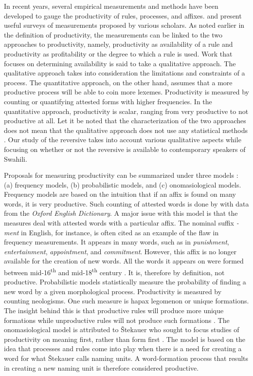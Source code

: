 \documentclass[output=paper]{langsci/langscibook}
\begin{document}
In recent years, several empirical measurements and methods have been developed to gauge the productivity of rules, processes, and affixes. \citet[143-161]{Bauer2001} and \citet{Fernandez-Dominguezetal2007} present useful surveys of measurements proposed by various scholars. As noted earlier in the definition of productivity, the measurements can be linked to the two approaches to productivity, namely, productivity as availability of a rule and productivity as profitability or the degree to which a rule is used. Work that focuses on determining availability is said to take a qualitative approach. The qualitative approach  takes into consideration the limitations and constraints of a process. The quantitative approach, on the other hand, assumes that a more productive process will be able to coin more lexemes. Productivity is measured by counting or quantifying attested forms with higher frequencies. In the quantitative approach, productivity is scalar, ranging from very productive to not productive at all. Let it be noted that the characterization of the two approaches does not mean that the qualitative approach does not use any statistical methods \citep[434-437]{Fernandez-Dominguez2013}. Our study of the reversive takes into account various qualitative aspects while focusing on whether or not the reversive is available to contemporary speakers of Swahili. 

Proposals for measuring productivity can be summarized under three models \citep[35]{Fernandez-Dominguezetal2007}: (a) frequency models, (b) probabilistic models, and (c) onomasiological models. Frequency models are based on the intuition that if an affix is found on many words, it is very productive. Such counting of attested words is done by \citet{Plag1999} with data from the \textit{Oxford English Dictionary}. A major issue with this model is that the measures deal with attested words with a particular affix. The nominal suffix \textit{-ment} in English, for instance, is often cited as an example of the flaw in frequency measurements. It appears in many words, such as in \textit{punishment}, \textit{entertainment}, \textit{appointment}, and \textit{commitment}. However, this affix is no longer available for the creation of new words. All the words it appears on were formed between mid-16\textsuperscript{th} and mid-18\textsuperscript{th} century \citep[181]{Bauer2001}. It is, therefore by definition, not productive. Probabilistic models statistically measure the probability of finding a new word by a given morphological process. Productivity is measured by counting neologisms. One such measure is hapax legomenon or unique formations. The insight behind this is that productive rules will produce more unique formations while unproductive rules will not produce such formations \citep{Baayen1992}. The onomasiological model is attributed to \v{S}tekauer who sought to focus studies of productivity on meaning first, rather than form first \citep{Stekauer2005}. The model is based on the idea that processes and rules come into play when there is a need for creating a word  for what \v{S}tekauer calls naming units. A word-formation process that results in creating a new naming unit is therefore considered productive. 
\end{document}
